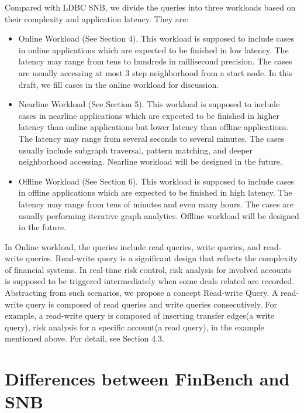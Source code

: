 Compared with LDBC SNB, we divide the queries into three workloads based on
their complexity and application latency. They are:
\begin{itemize}
    \item Online Workload (See Section 4). This workload is supposed to
    include cases in online applications which are expected to be finished in
    low latency. The latency may range from tens to hundreds in millisecond
    precision. The cases are usually accessing at most 3 step neighborhood from
    a start node. In this draft, we fill cases in the online workload for
    discussion.
    \item Nearline Workload (See Section 5). This workload is supposed to
    include cases in nearline applications which are expected to be finished in
    higher latency than online applications but lower latency than offline
    applications. The latency may range from several seconds to several minutes.
    The cases usually include subgraph traversal, pattern matching, and deeper
    neighborhood accessing. Nearline workload will be designed in the future.
    \item Offline Workload (See Section 6). This workload is supposed to
    include cases in offline applications which are expected to be finished in
    high latency. The latency may range from tens of minutes and even many
    hours. The cases are usually performing iterative graph analytics. Offline
    workload will be designed in the future.
\end{itemize}
In Online workload, the queries include read queries, write queries, and
read-write queries. Read-write query is a significant design that reflects the
complexity of financial systems. In real-time risk control, risk analysis for
involved accounts is supposed to be triggered intermediately when some deals
related are recorded. Abstracting from such scenarios, we propose a concept
Read-write Query. A read-write query is composed of read queries and write
queries consecutively. For example, a read-write query is composed of inserting
transfer edges(a write query), risk analysis for a specific account(a read
query), in the example mentioned above. For detail, see Section 4.3.

\section{Differences between FinBench and SNB}

